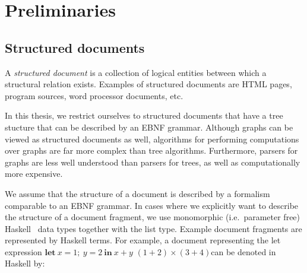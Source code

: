 




\section{Preliminaries}

\subsection{Structured documents} \label{sect:structdocs}



A {\em structured document} is a collection of logical entities between which a structural relation exists. Examples of structured documents are HTML pages, program sources, word processor documents, etc. 

In this thesis, we restrict ourselves to structured documents that have a tree stucture that can be described by an EBNF grammar. Although graphs can be viewed as structured documents as well, algorithms for performing computations over graphs are far more complex than tree algorithms. Furthermore, parsers for graphs are less well understood than parsers for trees, as well as computationally more expensive. 

We assume that the structure of a document is described by a formalism comparable to an EBNF grammar. In cases where we explicitly want to describe the structure of a document fragment, we use monomorphic (i.e.\ parameter free) Haskell~\cite{peytonJones03haskell} data types together with the list type. Example document fragments are represented by Haskell terms. For example, a document representing the let expression  $\mathbf{let}~x = 1;~y = 2~\mathbf{in}~x+y$
\bc $(1+2) \times (3 + 4)$\ec can be denoted in Haskell by: 

